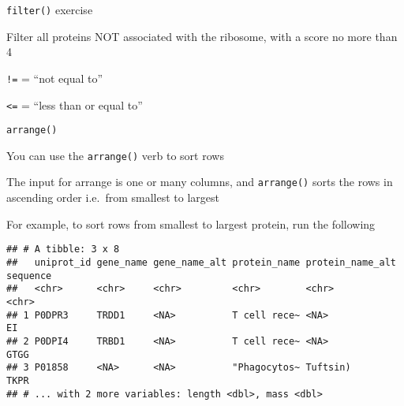 \documentclass[ignorenonframetext,]{beamer}
\newenvironment{Shaded}{\begin{snugshade}}{\end{snugshade}}
\newcommand{\DecValTok}[1]{\textcolor[rgb]{0.00,0.00,0.81}{#1}}
\newcommand{\KeywordTok}[1]{\textcolor[rgb]{0.13,0.29,0.53}{\textbf{#1}}}
\newcommand{\NormalTok}[1]{#1}
\newcommand{\OperatorTok}[1]{\textcolor[rgb]{0.81,0.36,0.00}{\textbf{#1}}}
\newcommand{\StringTok}[1]{\textcolor[rgb]{0.31,0.60,0.02}{#1}}
\begin{document}
\begin{frame}[fragile]{\texttt{filter()} exercise}
\protect\hypertarget{filter-exercise}{}

Filter all proteins NOT associated with the ribosome, with a score no
more than 4

\texttt{!=} = ``not equal to''

\texttt{\textless{}=} = ``less than or equal to''

\begin{Shaded}
\end{Shaded}

\end{frame}

\begin{frame}[fragile]{\texttt{arrange()}}
\protect\hypertarget{arrange}{}

You can use the \texttt{arrange()} verb to sort rows

The input for arrange is one or many columns, and \texttt{arrange()}
sorts the rows in ascending order i.e.~from smallest to largest

For example, to sort rows from smallest to largest protein, run the
following

\begin{Shaded}
\end{Shaded}

\begin{verbatim}
## # A tibble: 3 x 8
##   uniprot_id gene_name gene_name_alt protein_name protein_name_alt sequence
##   <chr>      <chr>     <chr>         <chr>        <chr>            <chr>   
## 1 P0DPR3     TRDD1     <NA>          T cell rece~ <NA>             EI      
## 2 P0DPI4     TRBD1     <NA>          T cell rece~ <NA>             GTGG    
## 3 P01858     <NA>      <NA>          "Phagocytos~ Tuftsin)         TKPR    
## # ... with 2 more variables: length <dbl>, mass <dbl>
\end{verbatim}

\end{frame}
\end{document}
